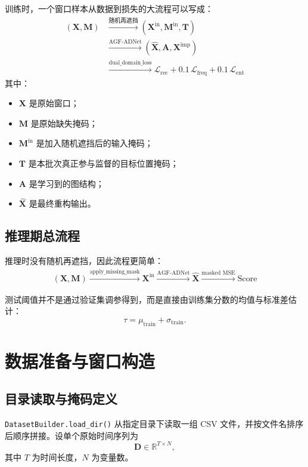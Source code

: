 \documentclass[UTF8]{ctexart}
\begin{document}
训练时，一个窗口样本从数据到损失的大流程可以写成：
\begin{align}
    (\bm{X}, \bm{M}) 
    &\xrightarrow{\text{随机再遮挡}}
    (\bm{X}^{\text{in}}, \bm{M}^{\text{in}}, \bm{T}) \\
    &\xrightarrow{\text{AGF-ADNet}}
    (\hat{\bm{X}}, \bm{A}, \bm{X}^{\text{imp}}) \\
    &\xrightarrow{\text{dual\_domain\_loss}}
    \mathcal{L}_{\text{rec}} + 0.1\,\mathcal{L}_{\text{freq}} + 0.1\,\mathcal{L}_{\text{ent}}
\end{align}
其中：
\begin{itemize}
    \item $\bm{X}$ 是原始窗口；
    \item $\bm{M}$ 是原始缺失掩码；
    \item $\bm{M}^{\text{in}}$ 是加入随机遮挡后的输入掩码；
    \item $\bm{T}$ 是本批次真正参与监督的目标位置掩码；
    \item $\bm{A}$ 是学习到的图结构；
    \item $\hat{\bm{X}}$ 是最终重构输出。
\end{itemize}

\subsection{推理期总流程}

推理时没有随机再遮挡，因此流程更简单：
\begin{align}
    (\bm{X}, \bm{M})
    \xrightarrow{\text{apply\_missing\_mask}}
    \bm{X}^{\text{in}}
    \xrightarrow{\text{AGF-ADNet}}
    \hat{\bm{X}}
    \xrightarrow{\text{masked MSE}}
    \text{Score}
\end{align}

测试阈值并不是通过验证集调参得到，而是直接由训练集分数的均值与标准差估计：
\begin{equation}
    \tau = \mu_{\text{train}} + \sigma_{\text{train}}.
\end{equation}

\section{数据准备与窗口构造}

\subsection{目录读取与掩码定义}

\texttt{DatasetBuilder.load\_dir()} 从指定目录下读取一组 CSV 文件，并按文件名排序后顺序拼接。设单个原始时间序列为
\begin{equation}
    \bm{D} \in \mathbb{R}^{T \times N},
\end{equation}
其中 $T$ 为时间长度，$N$ 为变量数。
\end{document}

